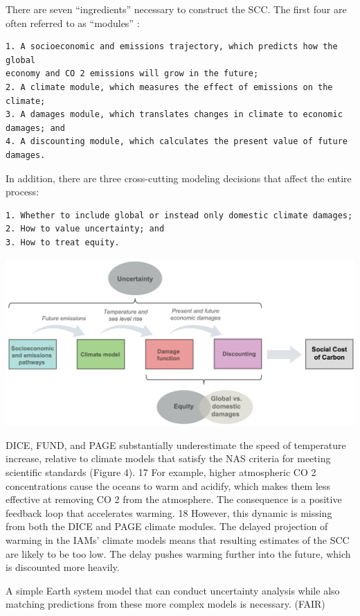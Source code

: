 \documentclass[
]{book}
\begin{document}
There are seven ``ingredients'' necessary to construct the SCC. The first four are often
referred to as ``modules'' :

\begin{verbatim}
1. A socioeconomic and emissions trajectory, which predicts how the global  
economy and CO 2 emissions will grow in the future;  
2. A climate module, which measures the effect of emissions on the climate;  
3. A damages module, which translates changes in climate to economic  
damages; and  
4. A discounting module, which calculates the present value of future  
damages.  
\end{verbatim}

In addition, there are three cross-cutting modeling decisions
that affect the entire process:

\begin{verbatim}
1. Whether to include global or instead only domestic climate damages;  
2. How to value uncertainty; and  
3. How to treat equity.  
\end{verbatim}

\includegraphics{fig/scc_steps.png}

DICE, FUND, and PAGE substantially
underestimate the speed of temperature increase, relative to climate models that satisfy
the NAS criteria for meeting scientific standards (Figure 4). 17 For example, higher
atmospheric CO 2 concentrations cause the oceans to warm and acidify, which makes
them less effective at removing CO 2 from the atmosphere. The consequence is a positive
feedback loop that accelerates warming. 18 However, this dynamic is missing from both
the DICE and PAGE climate modules.
The delayed projection
of warming in the IAMs' climate models means that resulting estimates of the SCC are
likely to be too low. The delay pushes warming further into the future, which is
discounted more heavily.

A simple Earth system model that can conduct uncertainty analysis while also
matching predictions from these more complex models is necessary. (FAIR)
\end{document}
